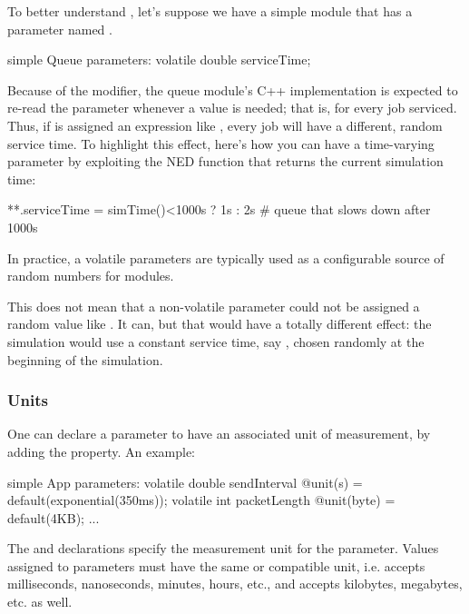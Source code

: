 To better understand , let's suppose we have a
 simple module that has a  parameter
named .

\begin{ned}
simple Queue
{
    parameters:
        volatile double serviceTime;
}
\end{ned}

Because of the  modifier, the queue module's C++
implementation is expected to re-read the  parameter
whenever a value is needed; that is, for every job serviced. Thus, if
 is assigned an expression like ,
every job will have a different, random service time. To highlight this
effect, here's how you can have a time-varying parameter by exploiting
the  NED function that returns the current simulation time:

\begin{inifile}
**.serviceTime = simTime()<1000s ? 1s : 2s  # queue that slows down after 1000s
\end{inifile}

In practice, a volatile parameters are typically used as a configurable
source of random numbers for modules.

\begin{note}
    This does not mean that a non-volatile parameter could not be assigned a
    random value like . It can, but that would
    have a totally different effect: the simulation would use a constant
    service time, say , chosen randomly at the beginning
    of the simulation.
\end{note}

\subsubsection{Units}

One can declare a parameter to have an associated unit of measurement,
by adding the  property. An example:

\begin{ned}
simple App
{
    parameters:
        volatile double sendInterval @unit(s) = default(exponential(350ms));
        volatile int packetLength @unit(byte) = default(4KB);
    ...
}
\end{ned}

The  and  declarations specify the measurement unit
for the parameter. Values assigned to parameters must have the same or
compatible unit, i.e.  accepts milliseconds, nanoseconds,
minutes, hours, etc., and  accepts kilobytes, megabytes,
etc. as well.

